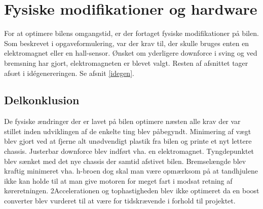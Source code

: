 \newpage
\section{Fysiske modifikationer og hardware}

For at optimere bilens omgangstid, er der fortaget fysiske modifikationer på bilen.
Som beskrevet i opgaveformulering, var der krav til, der skulle bruges enten en elektromagnet eller en hall-sensor.
Ønsket om yderligere downforce i sving og ved bremsning har gjort, elektromagneten er blevet valgt.
Resten af afsnittet tager afsæt i idégenereringen. Se afsnit \ref{idegen}.








\subsection{Delkonklusion}
De fysiske ændringer der er lavet på bilen optimere næsten alle krav der var stillet inden udviklingen af de enkelte ting blev påbegyndt.
Minimering af vægt blev gjort ved at fjerne alt unødvendigt plastik fra bilen og printe et nyt lettere chassis.
Justerbar downforce blev indført vha. en elektromagnet. Tyngdepunktet blev sænket med det nye chassis der samtid afstivet bilen.
Bremselængde blev kraftig minimeret vha. h-broen dog skal man være opmærksom på at tandhjulene ikke kan holde til at man give motoren for meget fart i modsat retning af køreretningen.
2Accelerationen og tophastigheden blev ikke optimeret da en boost converter blev vurderet til at være for tidskrævende i forhold til projektet.
